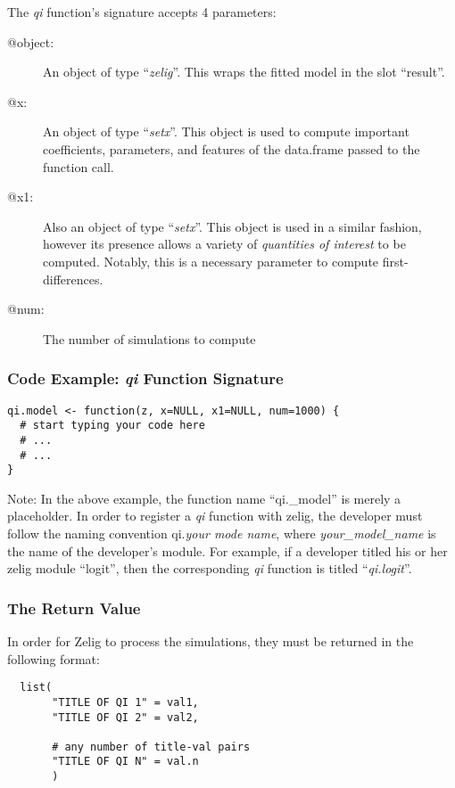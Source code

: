 The \emph{qi} function's signature accepts 4 parameters:


%
\begin{description}
	\item[@object:]{An object of type ``\emph{zelig}''.  This wraps the fitted model in the slot ``result''.}
	\item[@x:]{An object of type ``\emph{setx}''.  This object is used to compute important coefficients, parameters, and features of the data.frame passed to the function call.}
	\item[@x1:]{Also an object of type ``\emph{setx}''.  This object is used in a similar fashion, however its presence allows a variety of \emph{quantities of interest} to be computed.  Notably, this is a necessary parameter to compute first-differences.}
	\item[@num:]{The number of simulations to compute}
\end{description}


\subsubsection{Code Example: \emph{qi} Function Signature}
\begin{verbatim}
qi.model <- function(z, x=NULL, x1=NULL, num=1000) {
  # start typing your code here
  # ...
  # ...
}
\end{verbatim}


Note: In the above example, the function name ``qi.\_model'' is merely a placeholder.  In order to register a \emph{qi} function with zelig, the developer must follow the naming convention qi.\emph{your mode name}, where \emph{your\_model\_name} is the name of the developer's module.  For example, if a developer titled his or her zelig module ``logit'', then the corresponding \emph{qi} function is titled ``\emph{qi.logit}''.


\subsubsection{The Return Value}
In order for Zelig to process the simulations, they must be returned in the following format:

\begin{verbatim}
  list(
       "TITLE OF QI 1" = val1,
       "TITLE OF QI 2" = val2,

       # any number of title-val pairs
       "TITLE OF QI N" = val.n
       )
\end{verbatim}


